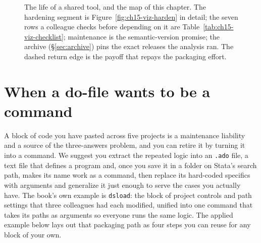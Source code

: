 \begin{figure}[htbp]
\centering
{}
\caption[The life of a shared tool]{The life of a shared tool, and the map of this chapter. The hardening segment is Figure~\ref{fig:ch15-viz-harden} in detail; the seven rows a colleague checks before depending on it are Table~\ref{tab:ch15-viz-checklist}; maintenance is the semantic-version promise; the archive (\S\ref{sec:archive}) pins the exact releases the analysis ran. The dashed return edge is the payoff that repays the packaging effort.}
\label{fig:ch15-viz-lifecycle}
\end{figure}

\section{When a do-file wants to be a command}
A block of code you have pasted across five projects is a maintenance liability and a source of the three-answers problem, and you can retire it by turning it into a command. We suggest you extract the repeated logic into an \texttt{.ado} file, a text file that defines a program and, once you save it in a folder on Stata's search path, makes its name work as a command, then replace its hard-coded specifics with arguments and generalize it just enough to serve the cases you actually have. The book's own example is \texttt{dsload}: the block of project controls and path settings that three colleagues had each modified, unified into one command that takes its paths as arguments so everyone runs the same logic. The applied example below lays out that packaging path as four steps you can reuse for any block of your own.


